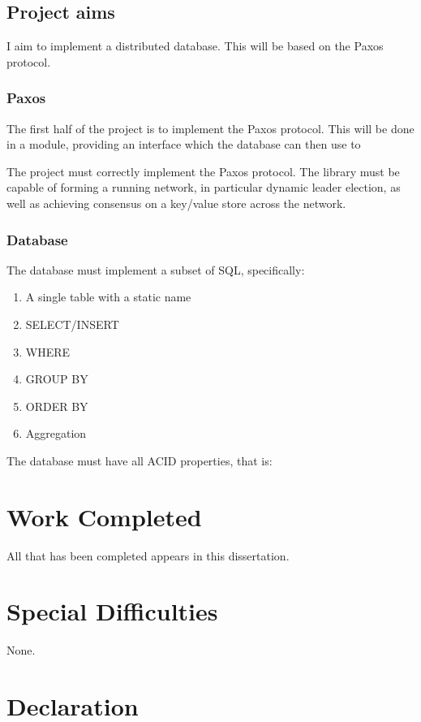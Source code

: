 \documentclass[12pt,twoside,notitlepage]{report}
\begin{document}
\subsection*{Project aims}

I aim to implement a distributed database. This will be based on the Paxos protocol.

\subsubsection*{Paxos}

The first half of the project is to implement the Paxos protocol. This will be done in a module,
providing an interface which the database can then use to 

The project must correctly implement the Paxos protocol.
The library must be capable of forming a running network,
in particular dynamic leader election,
as well as achieving consensus on a key/value store across the network.

\subsubsection*{Database}

The database must implement a subset of SQL, specifically:
\begin{enumerate}
\item A single table with a static name
\item SELECT/INSERT
\item WHERE
\item GROUP BY
\item ORDER BY
\item Aggregation
\end{enumerate}

The database must have all ACID properties, that is:


\section*{Work Completed}

All that has been completed appears in this dissertation.

\section*{Special Difficulties}

None.

\newpage
\section*{Declaration}
\end{document}
